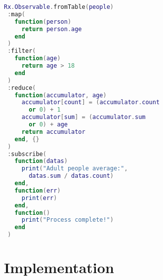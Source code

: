
\begin{minipage}{\linewidth}
\begin{lstlisting}[language=LUA,caption={Process pipeline example, using the library RxLua},label=pipeline-example]
Rx.Observable.fromTable(people)
 :map(
   function(person)
     return person.age
   end
 )
 :filter(
   function(age)
     return age > 18
   end
 )
 :reduce(
   function(accumulator, age)
     accumulator[count] = (accumulator.count
       or 0) + 1
     accumulator[sum] = (accumulator.sum
       or 0) + age
     return accumulator
   end, {}
 )
 :subscribe(
   function(datas)
     print("Adult people average:",
       datas.sum / datas.count)
   end,
   function(err)
     print(err)
   end,
   function()
     print("Process complete!")
   end
 )
\end{lstlisting}
\end{minipage}


\section{Implementation}
\label{sec:implementation}


